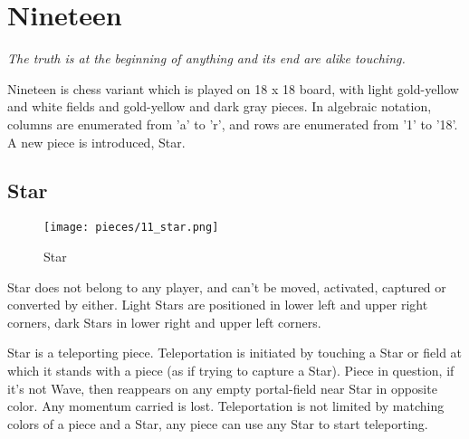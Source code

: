 

\chapter*{Nineteen}

\begin{flushright}
\parbox{0.8\textwidth}{
\emph{The truth is at the beginning of anything and its end are alike touching. \\
 } }
\end{flushright}

\noindent
Nineteen is chess variant which is played on 18 x 18 board, with
light gold-yellow and white fields and gold-yellow and dark gray
pieces. In algebraic notation, columns are enumerated from 'a' to 'r',
and rows are enumerated from '1' to '18'. A new piece is introduced,
Star.

\clearpage %

\section*{Star}

\noindent
\begin{wrapfigure}[11]{l}{0.4\textwidth}
\centering
\texttt{[image: pieces/11\_star.png]}
\caption{Star}
\label{fig:11_star}
\end{wrapfigure}
Star does not belong to any player, and can't be moved, activated, captured or converted by
either. Light Stars are positioned in lower left and upper right corners, dark Stars in lower
right and upper left corners.

Star is a teleporting piece. Teleportation is initiated by touching a Star or field at which
it stands with a piece (as if trying to capture a Star). Piece in question, if it's not Wave,
then reappears on any empty portal-field near Star in opposite color. Any momentum carried is
lost. Teleportation is not limited by matching colors of a piece and a Star, any piece can use
any Star to start teleporting.

